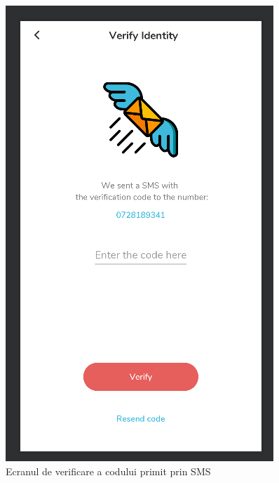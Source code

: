 \documentclass[12pt]{article}
\begin{document}
\begin{figure}[H]
\centering
\begin{minipage}[b]{0.4\textwidth}
    \includegraphics[width=\textwidth]{smsfrag.png}
    \caption{Ecranul de verificare a codului primit prin SMS}
\end{minipage}
\hfill
\begin{minipage}[b]{0.4\textwidth}

\end{minipage}
\end{figure}
\end{document}
